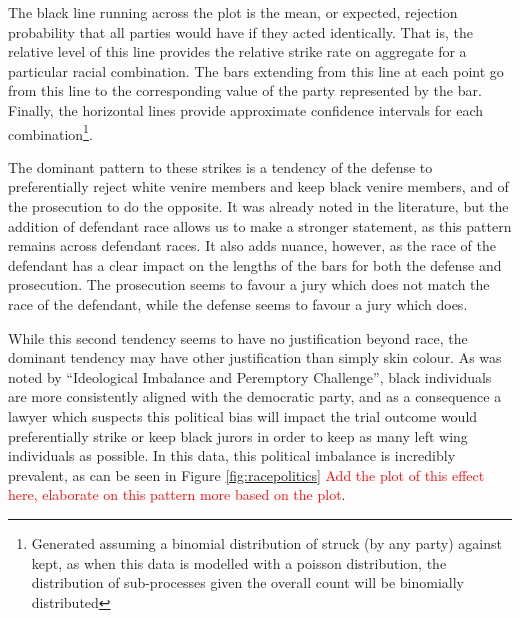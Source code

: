 \documentclass{article}
\begin{document}
The black line running across the plot is the mean, or expected, rejection probability that all parties would have if they acted
identically. That is, the relative level of this line provides the relative strike rate on aggregate for a particular racial
combination. The bars extending from this line at each point go from this line to the corresponding value of the party represented
by the bar. Finally, the horizontal lines provide approximate confidence intervals for each combination\footnote{Generated
  assuming a binomial distribution of struck (by any party) against kept, as when this data is modelled with a poisson
  distribution, the distribution of sub-processes given the overall count will be binomially distributed}.

The dominant pattern to these strikes is a tendency of the defense to preferentially reject white venire members and keep black
venire members, and of the prosecution to do the opposite. It was already noted in the literature\cite{JurySunshineProj}, but the
addition of defendant race allows us to make a stronger statement, as this pattern remains across defendant races. It also adds
nuance, however, as the race of the defendant has a clear impact on the lengths of the bars for both the defense and
prosecution. The prosecution seems to favour a jury which does not match the race of the defendant, while the defense seems to
favour a jury which does.

While this second tendency seems to have no justification beyond race, the dominant tendency may have other justification than
simply skin colour. As was noted by ``Ideological Imbalance and Peremptory Challenge'', black individuals are more consistently
aligned with the democratic party, and as a consequence a lawyer which suspects this political bias will impact the trial outcome
would preferentially strike or keep black jurors in order to keep as many left wing individuals as possible. In this data, this
political imbalance is incredibly prevalent, as can be seen in Figure \ref{fig:racepolitics} \textcolor{red}{Add the plot of this
  effect here, elaborate on this pattern more based on the plot}.
\end{document}
